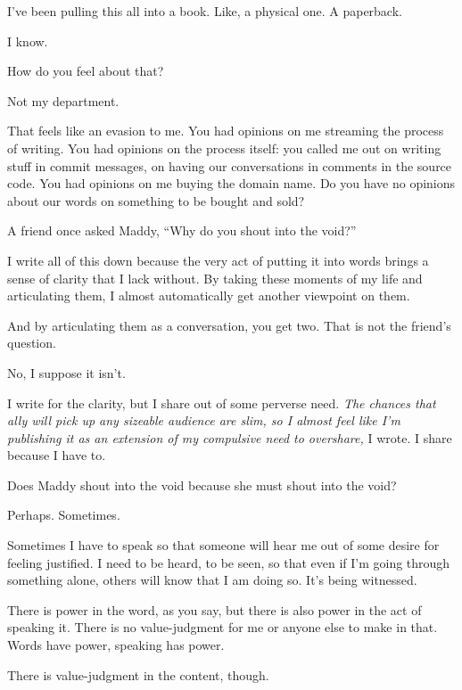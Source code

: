 \label{ally:31}
\begin{paracol}{2}
  \begin{leftcolumn}
\noindent I've been pulling this all into a book. Like, a physical one. A paperback.

\begin{ally}
I know.
\end{ally}
How do you feel about that?

\begin{ally}
Not my department.
\end{ally}
That feels like an evasion to me. You had opinions on me streaming the process of writing. You had opinions on the process itself: you called me out on writing stuff in commit messages, on having our conversations in comments in the source code. You had opinions on me buying the domain name. Do you have no opinions about our words on something to be bought and sold?

\begin{ally}
A friend once asked Maddy, ``Why do you shout into the void?''
\end{ally}
I write all of this down because the very act of putting it into words brings a sense of clarity that I lack without. By taking these moments of my life and articulating them, I almost automatically get another viewpoint on them.

\begin{ally}
And by articulating them as a conversation, you get two. That is not the friend's question.
\end{ally}
No, I suppose it isn't.

I write for the clarity, but I share out of some perverse need. \emph{The chances that ally will pick up any sizeable audience are slim, so I almost feel like I'm publishing it as an extension of my compulsive need to overshare,} I wrote. I share because I have to.

\begin{ally}
Does Maddy shout into the void because she must shout into the void?
\end{ally}
Perhaps. Sometimes.

Sometimes I have to speak so that someone will hear me out of some desire for feeling justified. I need to be heard, to be seen, so that even if I'm going through something alone, others will know that I am doing so. It's being witnessed.

\begin{ally}
There is power in the word, as you say, but there is also power in the act of speaking it. There is no value-judgment for me or anyone else to make in that. Words have power, speaking has power.
\end{ally}
There is value-judgment in the content, though.


\end{leftcolumn}
\end{paracol}
